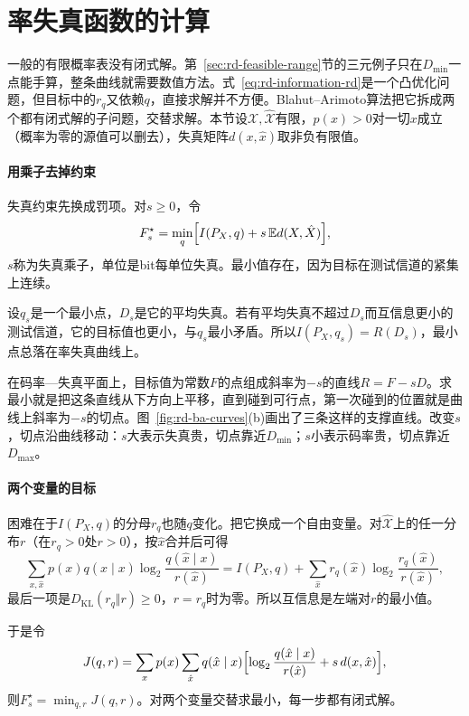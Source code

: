 \section{率失真函数的计算}
\label{sec:rd-computation}

一般的有限概率表没有闭式解。第~\ref{sec:rd-feasible-range}节的三元例子只在$D_{\min}$一点能手算，整条曲线就需要数值方法。式~\eqref{eq:rd-information-rd}是一个凸优化问题，但目标中的$r_q$又依赖$q$，直接求解并不方便。Blahut–Arimoto算法把它拆成两个都有闭式解的子问题，交替求解。本节设$\mathcal{X},\hat{\mathcal{X}}$有限，$p(x)>0$对一切$x$成立（概率为零的源值可以删去），失真矩阵$d(x,\hat{x})$取非负有限值。

\paragraph{用乘子去掉约束}
失真约束先换成罚项。对$s\geq0$，令
\begin{equation}
  F_s^{\star}=\min_{q}\Bigl[I(P_X,q)+s\,\mathbb{E}d(X,\hat{X})\Bigr],
  \label{eq:rd-lagrangian}
\end{equation}
$s$称为失真乘子，单位是bit每单位失真。最小值存在，因为目标在测试信道的紧集上连续。

设$q_s$是一个最小点，$D_s$是它的平均失真。若有平均失真不超过$D_s$而互信息更小的测试信道，它的目标值也更小，与$q_s$最小矛盾。所以$I(P_X,q_s)=R(D_s)$，最小点总落在率失真曲线上。

在码率—失真平面上，目标值为常数$F$的点组成斜率为$-s$的直线$R=F-sD$。求最小就是把这条直线从下方向上平移，直到碰到可行点，第一次碰到的位置就是曲线上斜率为$-s$的切点。图~\ref{fig:rd-ba-curves}(b)画出了三条这样的支撑直线。改变$s$，切点沿曲线移动：$s$大表示失真贵，切点靠近$D_{\min}$；$s$小表示码率贵，切点靠近$D_{\max}$。

\paragraph{两个变量的目标}
困难在于$I(P_X,q)$的分母$r_q$也随$q$变化。把它换成一个自由变量。对$\hat{\mathcal{X}}$上的任一分布$r$（在$r_q>0$处$r>0$），按$\hat{x}$合并后可得
\[
  \sum_{x,\hat{x}}p(x)q(\hat{x}\mid x)\log_2\frac{q(\hat{x}\mid x)}{r(\hat{x})}
  =I(P_X,q)+\sum_{\hat{x}}r_q(\hat{x})\log_2\frac{r_q(\hat{x})}{r(\hat{x})},
\]
最后一项是$D_{\mathrm{KL}}(r_q\Vert r)\geq0$，$r=r_q$时为零。所以互信息是左端对$r$的最小值。

于是令
\begin{equation}
  J(q,r)=\sum_{x}p(x)\sum_{\hat{x}}q(\hat{x}\mid x)\Bigl[\log_2\frac{q(\hat{x}\mid x)}{r(\hat{x})}+s\,d(x,\hat{x})\Bigr],
  \label{eq:rd-ba-objective}
\end{equation}
则$F_s^{\star}=\min_{q,r}J(q,r)$。对两个变量交替求最小，每一步都有闭式解。

